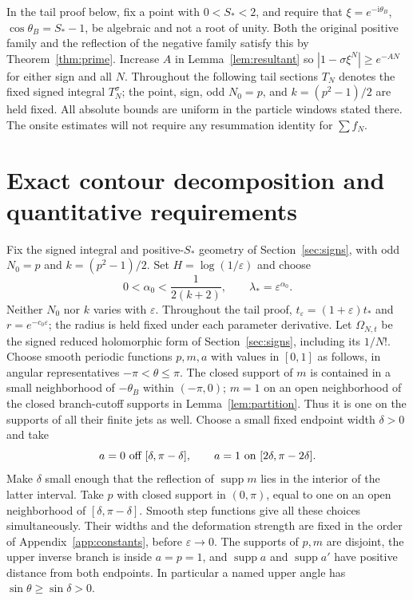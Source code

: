 \documentclass[11pt]{article}
\numberwithin{equation}{section}
\theoremstyle{definition}
\newcommand{\ii}{\mathrm i}
\newcommand{\eps}{\varepsilon}
\begin{document}
In the tail proof below, fix a point with $0<S_*<2$, and require
that $\xi=e^{-\ii\theta_B}$, $\cos\theta_B=S_*-1$, be algebraic
and not a root of unity. Both the original positive family and the
reflection of the negative family satisfy this by
Theorem~\ref{thm:prime}. Increase $A$ in Lemma~\ref{lem:resultant}
so $|1-\sigma\xi^N|\ge e^{-AN}$ for either sign and all $N$.
Throughout the following tail sections $T_N$ denotes the fixed
signed integral $T_N^\sigma$; the point, sign, odd $N_0=p$, and
$k=(p^2-1)/2$ are held fixed. All absolute bounds are uniform in
the particle windows stated there. The onsite estimates will not
require any resummation identity for $\sum f_N$.

\section{Exact contour decomposition and quantitative requirements}
\label{sec:tailreduction}
Fix the signed integral and positive-$S_*$ geometry of Section~\ref{sec:signs}, with odd $N_0=p$ and $k=(p^2-1)/2$.
Set \(H=\log(1/\eps)\) and choose
\begin{equation}
 0<\alpha_0<\frac1{2(k+2)},\qquad \lambda_*=\eps^{\alpha_0}.
 \label{eq:alphachoice}
\end{equation}
Neither \(N_0\) nor \(k\) varies with \(\eps\). Throughout the tail proof, $t_\eps=(1+\eps)t_*$ and $r=e^{-c_0\eps}$; the radius is held fixed under each parameter derivative.
Let $\Omega_{N,t}$ be the signed reduced holomorphic form of Section~\ref{sec:signs}, including its $1/N!$.
Choose smooth periodic functions \(p,m,a\) with values in \([0,1]\)
as follows, in angular representatives \(-\pi<\theta\le\pi\).
The closed support of \(m\) is contained in a small neighborhood of
\(-\theta_B\) within \((-\pi,0)\); \(m=1\) on an open neighborhood
of the closed branch-cutoff supports in Lemma~\ref{lem:partition}.
Thus it is one on the supports of all their finite jets as well.
Choose a small fixed endpoint width \(\delta>0\) and take
\[
 a=0\ \hbox{off }[\delta,\pi-\delta],\qquad
 a=1\ \hbox{on }[2\delta,\pi-2\delta].
\]
Make \(\delta\) small enough that the reflection of
\(\operatorname{supp}m\) lies in the interior of the latter interval.
Take \(p\) with closed support in \((0,\pi)\), equal to one on
an open neighborhood of \([\delta,\pi-\delta]\).
Smooth step functions give all these choices simultaneously.
Their widths and the deformation strength are fixed in the order
of Appendix~\ref{app:constants}, before \(\eps\to0\).
The supports of \(p,m\) are disjoint, the upper inverse branch is
inside \(a=p=1\), and \(\operatorname{supp}a\) and
\(\operatorname{supp}a'\) have positive distance from both endpoints.
In particular a named upper angle has \(\sin\theta\ge\sin\delta>0\).
\end{document}
